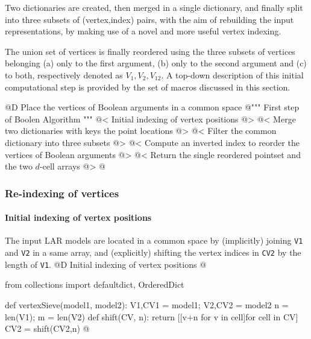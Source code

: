 \documentclass[11pt,oneside]{article}	%
\begin{document}
Two dictionaries are created, then merged in a single dictionary, and finally split into three subsets of (vertex,index) pairs, with the aim of rebuilding the input representations, by making use of a novel and more useful vertex indexing.

The union set of vertices is finally reordered using the three subsets of vertices belonging (a) only to the first argument, (b) only to the second argument and (c) to both, respectively denoted as $V_1, V_2, V_{12}$. A top-down description of this initial computational step is provided by the set of macros discussed in this section.

@D Place the vertices of Boolean arguments in a common space
@{""" First step of Boolen Algorithm """
@< Initial indexing of vertex positions @>
@< Merge two dictionaries with keys the point locations @>
@< Filter the common dictionary into three subsets @>
@< Compute an inverted index to reorder the vertices of Boolean arguments @>
@< Return the single reordered pointset and the two $d$-cell arrays @>
@}

\subsubsection{Re-indexing of vertices}

\paragraph{Initial indexing of vertex positions}
The input LAR models are located in a common space by (implicitly) joining \texttt{V1} and \texttt{V2} in a same array, and (explicitly) shifting the vertex indices in \texttt{CV2} by the length of \texttt{V1}.
@D Initial indexing of vertex positions
@{from collections import defaultdict, OrderedDict

def vertexSieve(model1, model2):
	V1,CV1 = model1; V2,CV2 = model2
	n = len(V1); m = len(V2)
	def shift(CV, n): 
		return [[v+n for v in cell]for cell in CV]
	CV2 = shift(CV2,n)
@}
\end{document}
